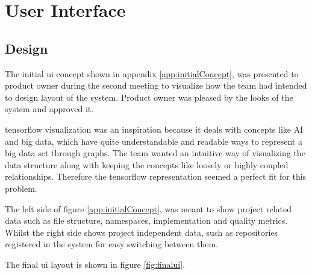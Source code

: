 \chapter{User Interface}
\label{chap:UI}

\section{Design}



The initial \gls{ui} concept shown in appendix \ref{app:initialConcept}, was presented to product owner during the second meeting to visualize how the team had intended to design layout of the system. Product owner was pleased by the looks of the system and approved it.

\gls{tensorflow} visualization was an inspiration because it deals with concepts like AI and big data, which have quite understandable and readable ways to represent a big data set through graphs. The team wanted an intuitive way of visualizing the data structure along with keeping the concepts like loosely or highly coupled relationships. Therefore the \gls{tensorflow} representation seemed a perfect fit for this problem.

The left side of figure \ref{app:initialConcept}, was meant to show project related data such as file structure, namespaces, implementation and quality metrics. Whilst the right side shows project independent data, such as repositories registered in the system for easy switching between them. 

The final \gls{ui} layout is shown in figure \ref{fig:finalui}.